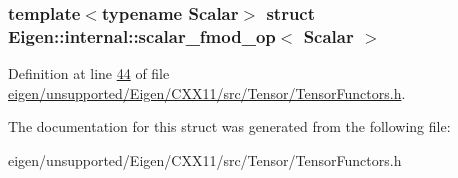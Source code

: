 \subsubsection*{template$<$typename Scalar$>$\newline
struct Eigen\+::internal\+::scalar\+\_\+fmod\+\_\+op$<$ Scalar $>$}



Definition at line \hyperlink{eigen_2unsupported_2_eigen_2_c_x_x11_2src_2_tensor_2_tensor_functors_8h_source_l00044}{44} of file \hyperlink{eigen_2unsupported_2_eigen_2_c_x_x11_2src_2_tensor_2_tensor_functors_8h_source}{eigen/unsupported/\+Eigen/\+C\+X\+X11/src/\+Tensor/\+Tensor\+Functors.\+h}.



The documentation for this struct was generated from the following file\+:\begin{DoxyCompactItemize}
\item 
eigen/unsupported/\+Eigen/\+C\+X\+X11/src/\+Tensor/\+Tensor\+Functors.\+h\end{DoxyCompactItemize}
